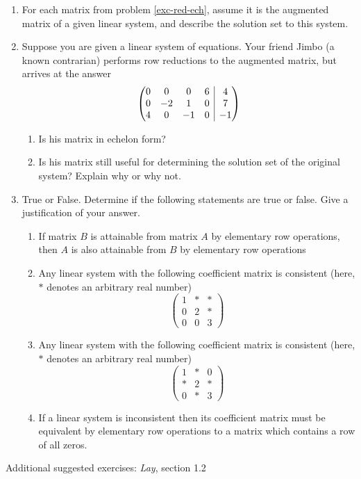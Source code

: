 \documentclass[12pt]{article}
\makeatletter
\numberwithin{equation}{subsection}
\numberwithin{figure}{subsection}
\theoremstyle{note}
\newenvironment{amatrix}[1]{%
  \left(\begin{array}{@{}*{#1}{c}|c@{}}
}{%
  \end{array}\right)
}
\makeatother
\begin{document}
\begin{enumerate}[label=\arabic*.]
\item For each matrix from problem \ref{exc-red-ech}, assume it is the augmented matrix of a given linear system, and describe the solution set to this system. 

\item Suppose you are given a linear system of equations. Your friend Jimbo (a known contrarian) performs row reductions to the augmented matrix, but arrives at the answer \[ \begin{amatrix}{4} 0 & 0 & 0 & 6 & 4 \\ 0 & -2 & 1 & 0 & 7 \\ 4 & 0 & -1 & 0& -1\end{amatrix} \]
\begin{enumerate} \item Is his matrix in echelon form? 
\item Is his matrix still useful for determining the solution set of the original system? Explain why or why not. 
\end{enumerate}

\item True or False. Determine if the following statements are true or false. Give a justification of your answer. 
\begin{enumerate}
	\item If matrix $B$ is attainable from matrix $A$ by elementary row operations, then $A$ is also attainable from $B$ by elementary row operations
	\item Any linear system with the following coefficient matrix is consistent (here, $*$ denotes an arbitrary real number)  \[ \begin{pmatrix} 1 & * & * \\ 0 & 2 & * \\ 0 & 0 & 3\end{pmatrix} \] 
		\item Any linear system with the following coefficient matrix is consistent (here, $*$ denotes an arbitrary real number)  \[ \begin{pmatrix} 1 & * & 0 \\ * & 2 & * \\ 0 & * & 3\end{pmatrix} \] 
	\item If a linear system is inconsistent then its coefficient matrix must be equivalent by elementary row operations to a matrix which contains a row of all zeros. 
\end{enumerate}
\end{enumerate}
Additional suggested exercises: \textit{Lay}, section 1.2
\end{document}
